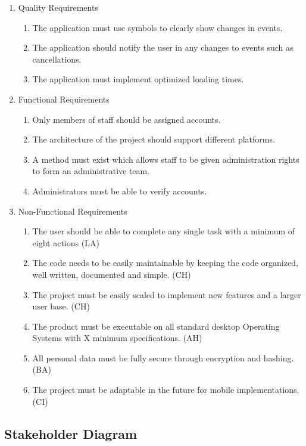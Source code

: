 \documentclass[a4paper]{article}
\begin{document}
\begin{enumerate}
  \item Quality Requirements
  \begin{enumerate}[label=Q\arabic*.]
    \item The application must use symbols to clearly show changes in events.
    \item The application should notify the user in any changes to events such as cancellations.
    \item The application must implement optimized loading times.
  \end{enumerate}
  \item Functional Requirements
  \begin{enumerate}[label=F\arabic*.]
    \item Only members of staff should be assigned accounts.
    \item The architecture of the project should support different platforms.
    \item A method must exist which allows staff to be given administration rights to form an administrative team.
    \item Administrators must be able to verify accounts.
  \end{enumerate}
  \item Non-Functional Requirements
  \begin{enumerate}[label=NF\arabic*.] %
  	  \item The user should be able to complete any single task with a minimum of eight actions (LA)
      \item The code needs to be easily maintainable by keeping the code organized, well written, documented and simple. (CH)
      \item The project must be easily scaled to implement new features and a larger user base. (CH) %
      \item The product must be executable on all standard desktop Operating Systems with X minimum specifications. (AH)
      \item All personal data must be fully secure through encryption and hashing. (BA)
      \item The project must be adaptable in the future for mobile implementations. (CI)
  \end{enumerate}
\end{enumerate}

\clearpage %
\subsection{Stakeholder Diagram}
\end{document}
